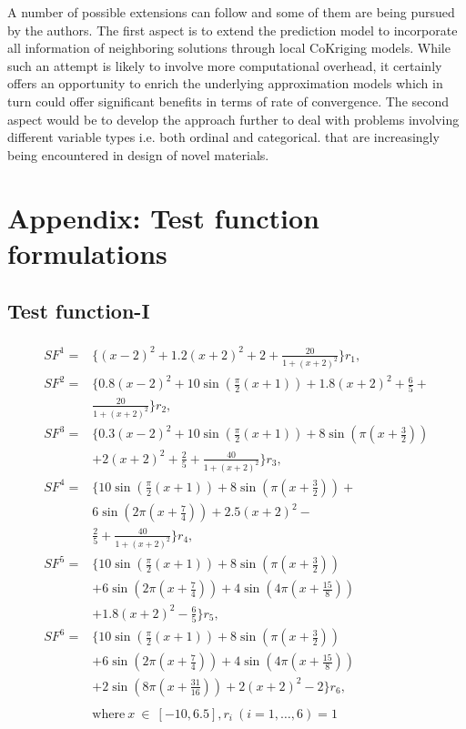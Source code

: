 A number of possible extensions can follow and some of them are being pursued by the authors. The first aspect is to extend the prediction model to incorporate all information of neighboring solutions through local CoKriging models. While such an attempt is likely to involve more computational overhead, it certainly offers an opportunity to enrich the underlying approximation models which in turn could offer significant benefits in terms of rate of convergence. The second aspect would be to develop the approach further to deal with problems involving different variable types i.e. both ordinal and categorical. that are increasingly being encountered in design of novel materials.  

\section*{Appendix: Test function formulations}

\subsection{Test function-I}
{\small
	\begin{align}
		\begin{split} 
			SF^1 ={} &\{(x - 2)^2 + 1.2(x + 2)^2 + 2 + \frac{20}{1 + (x + 2)^2}\}r_1,\\
			SF^2 ={} &\{0.8(x - 2)^2 + 10\sin(\frac{\pi}{2}(x + 1)) + 1.8(x + 2)^2 + \frac{6}{5} + \\
			& \frac{20}{1 + (x + 2)^2}\}r_2,\\ 
			SF^3 ={} &\{0.3(x - 2)^2 + 10\sin(\frac{\pi}{2}(x + 1)) + 8\sin(\pi(x + \frac{3}{2})) \\ 
			& + 2(x + 2)^2 + \frac{2}{5} + \frac{40}{1 + (x + 2)^2}\}r_3,\\ 
			SF^4 ={} &\{10\sin(\frac{\pi}{2}(x + 1)) + 8\sin(\pi(x + \frac{3}{2})) + \\ 
			& 6\sin(2\pi(x + \frac{7}{4})) + 2.5(x + 2)^2 - \\ 
			& \frac{2}{5} + \frac{40}{1 + (x + 2)^2}\}r_4,\\ 
			SF^5 ={} &\{10\sin(\frac{\pi}{2}(x + 1)) + 8\sin(\pi(x + \frac{3}{2})) \\
			& + 6\sin(2\pi(x + \frac{7}{4})) + 4\sin(4\pi(x + \frac{15}{8})) \\ 
			& + 1.8(x + 2)^2 - \frac{6}{5}\}r_5,\\
			SF^6 ={} &\{10\sin(\frac{\pi}{2}(x + 1)) + 8\sin(\pi(x + \frac{3}{2})) \\
			& + 6\sin(2\pi(x + \frac{7}{4})) + 4\sin(4\pi(x + \frac{15}{8}))\\ 
			& + 2\sin(8\pi(x + \frac{31}{16})) + 2(x + 2)^2 - 2\}r_6,\\ \\
			&\text{where}~x~\in~[-10,6.5], r_i~(i = 1,\ldots,6) = 1
			\label{eq:testfunc1}
		\end{split}
\end{align}}%

